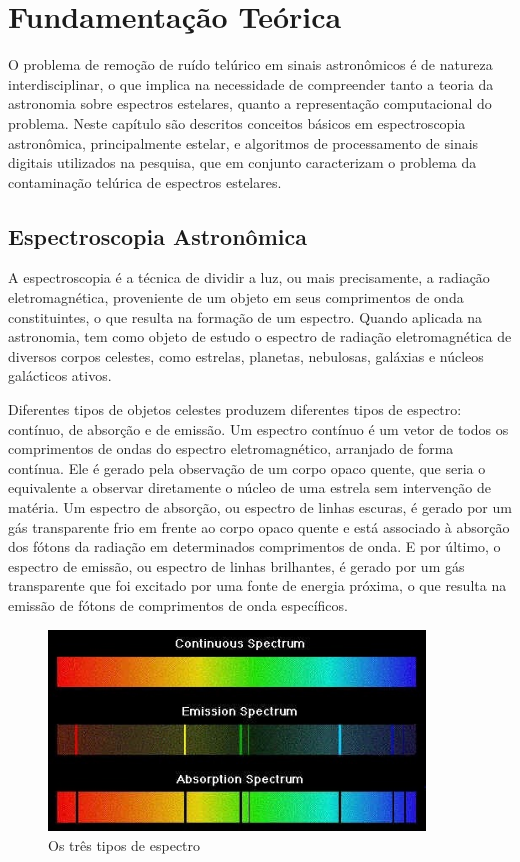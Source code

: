 \chapter{Fundamentação Teórica}
\label{cap:fundamentacao-teorica}

O problema de remoção de ruído telúrico em sinais astronômicos é de natureza interdisciplinar, o que implica na necessidade de compreender tanto a teoria da astronomia sobre espectros estelares, quanto a representação computacional do problema.
Neste capítulo são descritos conceitos básicos em espectroscopia astronômica, principalmente estelar, e algoritmos de processamento de sinais digitais utilizados na pesquisa, que em conjunto caracterizam o problema da contaminação telúrica de espectros estelares.

\section{Espectroscopia Astronômica} \label{astronomic-spectroscopy}

A espectroscopia é a técnica de dividir a luz, ou mais precisamente, a radiação eletromagnética, proveniente de um objeto em seus comprimentos de onda constituintes, o que resulta na formação de um espectro. Quando aplicada na astronomia, tem como objeto de estudo o espectro de radiação eletromagnética de diversos corpos celestes, como estrelas, planetas, nebulosas, galáxias e núcleos galácticos ativos.

Diferentes tipos de objetos celestes produzem diferentes tipos de espectro:  contínuo, de absorção e de emissão. Um espectro contínuo é um vetor de todos os comprimentos de ondas do espectro eletromagnético, arranjado de forma contínua. Ele é gerado pela observação de um corpo opaco quente, que seria o equivalente a observar diretamente o núcleo de uma estrela sem intervenção de matéria. Um espectro de absorção, ou espectro de linhas escuras, é gerado por um gás transparente frio em frente ao corpo opaco quente e está associado à absorção dos fótons da radiação em determinados comprimentos de onda. E por último, o espectro de emissão, ou espectro de linhas brilhantes, é gerado por um gás transparente que foi excitado por uma fonte de energia próxima, o que resulta na emissão de fótons de comprimentos de onda específicos. 

\begin{figure}[htb]
\centering
\includegraphics[width=10cm]{figuras/spectypes.jpg}
\caption{Os três tipos de espectro}
\label{fig:spectrum-types}
\end{figure}

